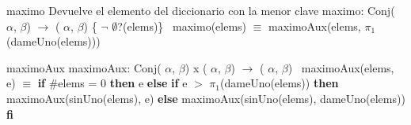 \begin{DoxyParagraph}{maximo}
Devuelve el elemento del diccionario con la menor clave maximo\+: Conj( $\alpha$, $\beta$) $\to$ ( $\alpha$, $\beta$) \{ $\lnot$ $\emptyset$?(elems)\}~\newline
 maximo(elems) $\equiv$ maximo\+Aux(elems, $\pi_1$(dame\+Uno(elems))) 
\end{DoxyParagraph}


\begin{DoxyParagraph}{maximo\+Aux}
maximo\+Aux\+: Conj( $\alpha$, $\beta$) x ( $\alpha$, $\beta$) $\to$ ( $\alpha$, $\beta$)~\newline
 maximo\+Aux(elems, e) $\equiv$ {\bfseries if} \#elems = 0 {\bfseries then} e {\bfseries else} {\bfseries if} e $>$ $\pi_1$(dame\+Uno(elems)) {\bfseries then} maximo\+Aux(sin\+Uno(elems), e) {\bfseries else} maximo\+Aux(sin\+Uno(elems), dame\+Uno(elems)) {\bfseries fi} 
\end{DoxyParagraph}
